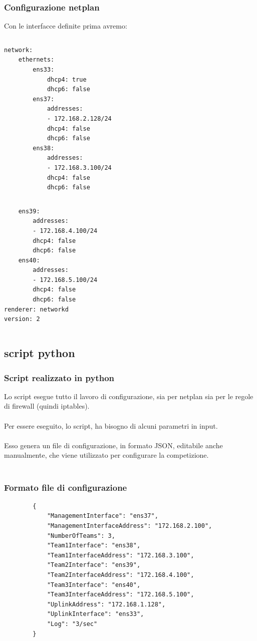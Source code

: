 \documentclass{beamer}
\begin{document}
\begin{frame}[fragile]
    \frametitle{Configurazione netplan}
    Con le interfacce definite prima avremo:
    \begin{column}{0.45\textwidth}
        \begin{lstlisting}
network:
    ethernets:
        ens33:
            dhcp4: true
            dhcp6: false
        ens37:
            addresses:
            - 172.168.2.128/24
            dhcp4: false
            dhcp6: false
        ens38:
            addresses:
            - 172.168.3.100/24
            dhcp4: false
            dhcp6: false
        \end{lstlisting}
    \end{column}
    \begin{column}{0.45\textwidth}
        \begin{lstlisting}
    ens39:
        addresses:
        - 172.168.4.100/24
        dhcp4: false
        dhcp6: false
    ens40:
        addresses:
        - 172.168.5.100/24
        dhcp4: false
        dhcp6: false
renderer: networkd
version: 2
        \end{lstlisting}
    \end{column}
    

\end{frame}

\subsection*{script python}
\begin{frame}
    \frametitle{Script realizzato in python}

    Lo script esegue tutto il lavoro di configurazione, sia per netplan sia per le regole di firewall (quindi iptables).
    \\~\\
    Per essere eseguito, lo script, ha bisogno di alcuni parametri in input.
    \\~\\
    Esso genera un file di configurazione, in formato JSON, editabile anche manualmente, che viene utilizzato per configurare la competizione.
    \\~\\

\end{frame}

\begin{frame}[fragile]
    \frametitle{Formato file di configurazione}
    \begin{lstlisting}
        {
            "ManagementInterface": "ens37",
            "ManagementInterfaceAddress": "172.168.2.100",
            "NumberOfTeams": 3,
            "Team1Interface": "ens38",
            "Team1InterfaceAddress": "172.168.3.100",
            "Team2Interface": "ens39",
            "Team2InterfaceAddress": "172.168.4.100",
            "Team3Interface": "ens40",
            "Team3InterfaceAddress": "172.168.5.100",
            "UplinkAddress": "172.168.1.128",
            "UplinkInterface": "ens33",
            "Log": "3/sec"
        }
    \end{lstlisting}

\end{frame}
\end{document}
